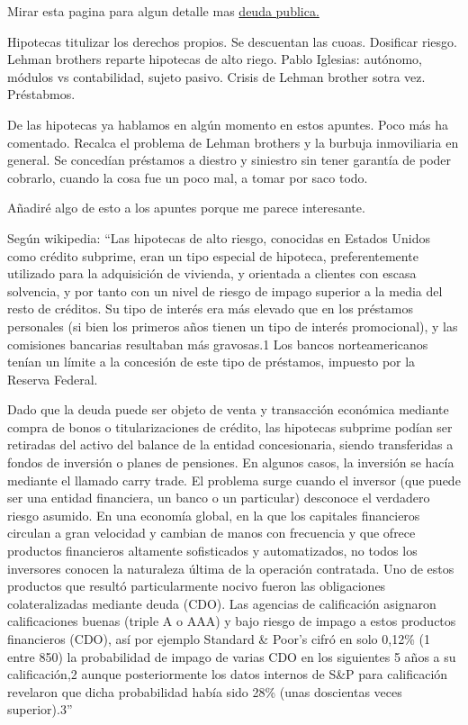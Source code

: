 \documentclass[nochap,palatino,shortheader]{apuntes}
\begin{document}
Mirar esta pagina para algun detalle mas \href{http://www.finanzasparatodos.es/es/productosyservicios/productosinversionrentafija/deudapublica.html}{deuda publica.}

\color{black}
Hipotecas titulizar los derechos propios. Se descuentan las cuoas. Dosificar riesgo. Lehman brothers reparte hipotecas de alto riego. Pablo Iglesias: autónomo, módulos vs contabilidad, sujeto pasivo. Crisis de Lehman brother sotra vez. Préstabmos.

\color{blue}

De las hipotecas ya hablamos en algún momento en estos apuntes. Poco más ha comentado. Recalca el problema de Lehman brothers y la burbuja inmoviliaria en general. Se concedían préstamos a diestro y siniestro sin tener garantía de poder cobrarlo, cuando la cosa fue un poco mal, a tomar por saco todo.

Añadiré algo de esto a los apuntes porque me parece interesante.

Según wikipedia:
``Las hipotecas de alto riesgo, conocidas en Estados Unidos como crédito subprime, eran un tipo especial de hipoteca, preferentemente utilizado para la adquisición de vivienda, y orientada a clientes con escasa solvencia, y por tanto con un nivel de riesgo de impago superior a la media del resto de créditos. Su tipo de interés era más elevado que en los préstamos personales (si bien los primeros años tienen un tipo de interés promocional), y las comisiones bancarias resultaban más gravosas.1 Los bancos norteamericanos tenían un límite a la concesión de este tipo de préstamos, impuesto por la Reserva Federal.

Dado que la deuda puede ser objeto de venta y transacción económica mediante compra de bonos o titularizaciones de crédito, las hipotecas subprime podían ser retiradas del activo del balance de la entidad concesionaria, siendo transferidas a fondos de inversión o planes de pensiones. En algunos casos, la inversión se hacía mediante el llamado carry trade. El problema surge cuando el inversor (que puede ser una entidad financiera, un banco o un particular) desconoce el verdadero riesgo asumido. En una economía global, en la que los capitales financieros circulan a gran velocidad y cambian de manos con frecuencia y que ofrece productos financieros altamente sofisticados y automatizados, no todos los inversores conocen la naturaleza última de la operación contratada. Uno de estos productos que resultó particularmente nocivo fueron las obligaciones colateralizadas mediante deuda (CDO). Las agencias de calificación asignaron calificaciones buenas (triple A o AAA) y bajo riesgo de impago a estos productos financieros (CDO), así por ejemplo Standard \& Poor's cifró en solo 0,12\% (1 entre 850) la probabilidad de impago de varias CDO en los siguientes 5 años a su calificación,2 aunque posteriormente los datos internos de S\&P para calificación revelaron que dicha probabilidad había sido 28\% (unas doscientas veces superior).3''
\end{document}
